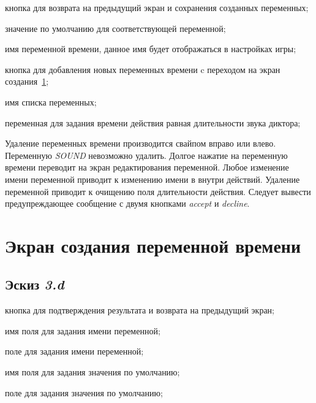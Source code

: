 \begin{enumerate*}
    \item кнопка для возврата на предыдущий экран и сохранения созданных переменных;
    \item значение по умолчанию для соответствующей переменной;
    \item имя переменной времени, данное имя будет отображаться в настройках игры;
    \item кнопка для добавления новых переменных времени c переходом на экран создания~\ref{lbl:game-time-var-new};
    \item имя списка переменных;
    \item переменная для задания времени действия равная длительности звука диктора;
\end{enumerate*}
Удаление переменных времени производится свайпом вправо или влево. Переменную \emph{SOUND} невозможно удалить. Долгое нажатие на переменную времени переводит на экран редактирования переменной.  Любое изменение имени переменной приводит к изменению имени в внутри действий. Удаление переменной приводит к очищению поля длительности действия. Следует вывести предупреждающее сообщение с двумя кнопками \emph{accept} и \emph{decline}.

\section{Экран создания переменной времени}\label{lbl:game-time-var-new}

\subsection{Эскиз \emph{3.d}}

\begin{enumerate*}
    \item кнопка для подтверждения результата и возврата на предыдущий экран;
    \item имя поля для задания имени переменной;
    \item поле для задания имени переменной;
    \item имя поля для задания значения по умолчанию;
    \item поле для задания значения по умолчанию;
\end{enumerate*}


